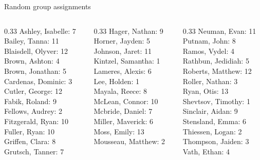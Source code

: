 \documentclass[10pt]{beamer}
\begin{document}
\begin{frame}{Random group assignments}
\begin{columns}
\begin{column}{0.33\textwidth}
Ashley, Isabelle: 7 \\ 
Bailey, Tanna: 11 \\ 
Blaisdell, Olyver: 12 \\ 
Brown, Ashton: 4 \\ 
Brown, Jonathan: 5 \\ 
Cardenas, Dominic: 3 \\ 
Cutler, George: 12 \\ 
Fabik, Roland: 9 \\ 
Fellows, Audrey: 2 \\ 
Fitzgerald, Ryan: 10 \\ 
Fuller, Ryan: 10 \\ 
Griffen, Clara: 8 \\ 
Grutsch, Tanner: 7 \\\end{column}
\begin{column}{0.33\textwidth}
Hager, Nathan: 9 \\ 
Horner, Jayden: 5 \\ 
Johnson, Jaret: 11 \\ 
Kintzel, Samantha: 1 \\ 
Lameres, Alexis: 6 \\ 
Lee, Holden: 1 \\ 
Mayala, Reece: 8 \\ 
McLean, Connor: 10 \\ 
Mcbride, Daniel: 7 \\ 
Miller, Maverick: 6 \\ 
Moss, Emily: 13 \\ 
Mousseau, Matthew: 2 \\\end{column}
\begin{column}{0.33\textwidth}
Neuman, Evan: 11 \\ 
Putnam, John: 8 \\ 
Ramos, Vydel: 4 \\ 
Rathbun, Jedidiah: 5 \\ 
Roberts, Matthew: 12 \\ 
Roller, Nathan: 3 \\ 
Ryan, Otis: 13 \\ 
Shevtsov, Timothy: 1 \\ 
Sinclair, Aidan: 9 \\ 
Stensland, Emma: 6 \\ 
Thiessen, Logan: 2 \\ 
Thompson, Jaiden: 3 \\ 
Vath, Ethan: 4 \\\end{column}
\end{columns}
\end{frame}
\end{document}
